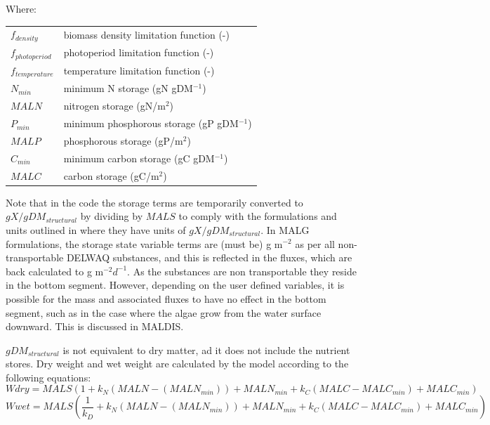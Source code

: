 \documentclass{deltares_manual}
\begin{document}
Where:\\

\begin{tabular}{ll}
$f_{density}$ & biomass density limitation function (-)\\
$f_{photoperiod}$ & photoperiod limitation function (-)\\
$f_{temperature}$ & temperature limitation function (-)\\
$N_{min}$ & minimum N storage (gN gDM$^{-1}$)\\
$MALN$ & nitrogen storage (gN/m$^2$)\\
$P_{min}$ & minimum phosphorous storage (gP gDM$^{-1}$)\\
$MALP$ & phosphorous storage (gP/m$^2$)\\
$C_{min}$ & minimum carbon storage (gC gDM$^{-1}$)\\
$MALC$ & carbon storage (gC/m$^2$)\\
\end{tabular}

Note that in the code the storage terms are temporarily converted to $gX/gDM_{structural}$ by dividing by $MALS$ to comply with the formulations and units outlined in \cite{broch2012} where they have units of $gX/gDM_{structural}$. In MALG formulations, the storage state variable terms are (must be) g m$^{-2}$ as per all non-transportable DELWAQ substances, and this is reflected in the fluxes, which are back calculated to g m$^{-2}d^{-1}$. As the substances are non transportable they reside in the bottom segment. However, depending on the user defined variables, it is possible for the mass and associated fluxes to have no effect in the bottom segment, such as in the case where the algae grow from the water surface downward. This is discussed in MALDIS.

$gDM_{structural}$ is not equivalent to dry matter, ad it does not include the nutrient stores. Dry weight and wet weight are calculated by the model according to the following equations:
\begin{equation}
Wdry = MALS(1 + k_N(MALN - (MALN_{min})) + MALN_{min} + k_C(MALC - MALC_{min})+ MALC_{min})
\end{equation}
\begin{equation}
Wwet = MALS(\frac{1}{k_D} + k_N(MALN - (MALN_{min})) + MALN_{min} + k_C(MALC - MALC_{min}) + MALC_{min})
\end{equation}
\end{document}
